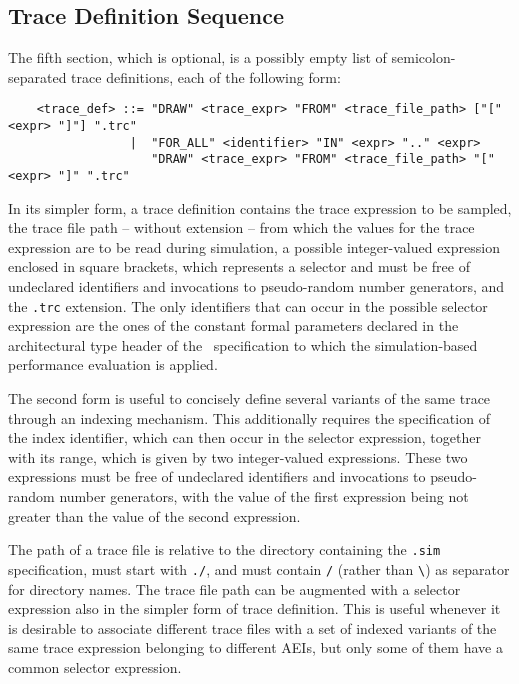 \subsection{Trace Definition Sequence}

The fifth section, which is optional, is a possibly empty list of semicolon-separated trace definitions,
each of the following form:

        \begin{verbatim}
    <trace_def> ::= "DRAW" <trace_expr> "FROM" <trace_file_path> ["[" <expr> "]"] ".trc"
                 |  "FOR_ALL" <identifier> "IN" <expr> ".." <expr>
                    "DRAW" <trace_expr> "FROM" <trace_file_path> "[" <expr> "]" ".trc"
        \end{verbatim}

In its simpler form, a trace definition contains the trace expression to be sampled, the trace file path --
without extension -- from which the values for the trace expression are to be read during simulation, a
possible integer-valued expression enclosed in square brackets, which represents a selector and must be free
of undeclared identifiers and invocations to pseudo-random number generators, and the {\tt .trc} extension.
The only identifiers that can occur in the possible selector expression are the ones of the constant formal
parameters declared in the architectural type header of the \aemilia\ specification to which the
simulation-based performance evaluation is applied.

The second form is useful to concisely define several variants of the same trace through an indexing
mechanism. This additionally requires the specification of the index identifier, which can then occur in the
selector expression, together with its range, which is given by two integer-valued expressions. These two
expressions must be free of undeclared identifiers and invocations to pseudo-random number generators, with
the value of the first expression being not greater than the value of the second expression.

The path of a trace file is relative to the directory containing the {\tt .sim} specification, must start
with {\tt ./}, and must contain {\tt /} (rather than \verb+\+) as separator for directory names. The trace
file path can be augmented with a selector expression also in the simpler form of trace definition. This is
useful whenever it is desirable to associate different trace files with a set of indexed variants of the
same trace expression belonging to different AEIs, but only some of them have a common selector expression.

